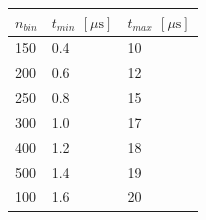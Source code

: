 \begin{tabular}{lll}
\hline
$n_{bin}$ & $t_{min}$ $ [\mu \text{s}]$ & $t_{max}$ $[\mu \text{s}]$ \\ \hline
150       & 0.4                    & 10                    \\
200       & 0.6                    & 12                    \\
250       & 0.8                    & 15                    \\
300       & 1.0                    & 17                    \\
400       & 1.2                    & 18                    \\
500       & 1.4                    & 19                    \\
100       & 1.6                    & 20                    \\ \hline
\end{tabular}
